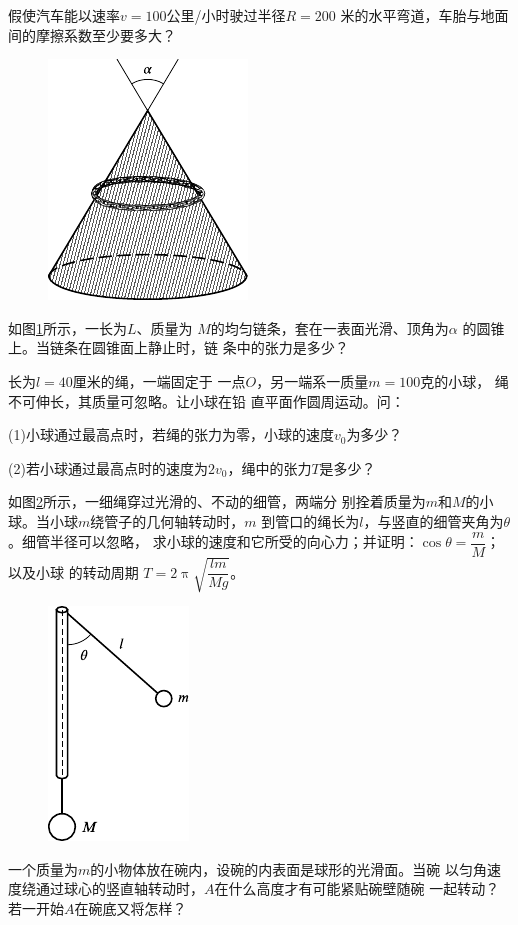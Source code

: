 \begin{exercises}
\exercise 假使汽车能以速率$ v = 1 0 0 $公里/小时驶过半径$ R = 2 0 0 $
米的水平弯道，车胎与地面间的摩擦系数至少要多大？

\begin{figure}
  \centering
  \includegraphics{figure/fig03.33}
  \caption{}
  \label{fig:03.33}
\end{figure}
\exercise 如图\ref{fig:03.33}所示，一长为$ L $、质量为
$ M $的均匀链条，套在一表面光滑、顶角为$ \alpha $
的圆锥上。当链条在圆锥面上静止时，链
条中的张力是多少？

\exercise 长为$ l = 4 0 $厘米的绳，一端固定于
一点$ O $，另一端系一质量$ m = 1 0 0 $克的小球，
绳不可伸长，其质量可忽略。让小球在铅
直平面作圆周运动。问：

(1)小球通过最高点时，若绳的张力为零，小球的速度$ v _ { 0 } $为多少？

(2)若小球通过最高点时的速度为$ 2 v _ { 0 } $，绳中的张力$ T $是多少？

\exercise 如图\ref{fig:03.34}所示，一细绳穿过光滑的、不动的细管，两端分
别拴着质量为$ m $和$ M $的小球。当小球$ m $绕管子的几何轴转动时，$ m $
到管口的绳长为$ l $，与竖直的细管夹角为$ \theta $。细管半径可以忽略，
求小球的速度和它所受的向心力；并证明：$ \cos \theta = \dfrac { m } { M } $； 以及小球
的转动周期
$ T = 2 \uppi \sqrt{\dfrac { l m } { M g }} $。

\begin{figure}
  \centering
  \includegraphics{figure/fig03.34}
  \caption{}
  \label{fig:03.34}
\end{figure}
\exercise 一个质量为$ m $的小物体放在碗内，设碗的内表面是球形的光滑面。当碗
以匀角速度绕通过球心的竖直轴转动时，$ A $在什么高度才有可能紧贴碗壁随碗
一起转动？若一开始$ A $在碗底又将怎样？


\end{exercises}

